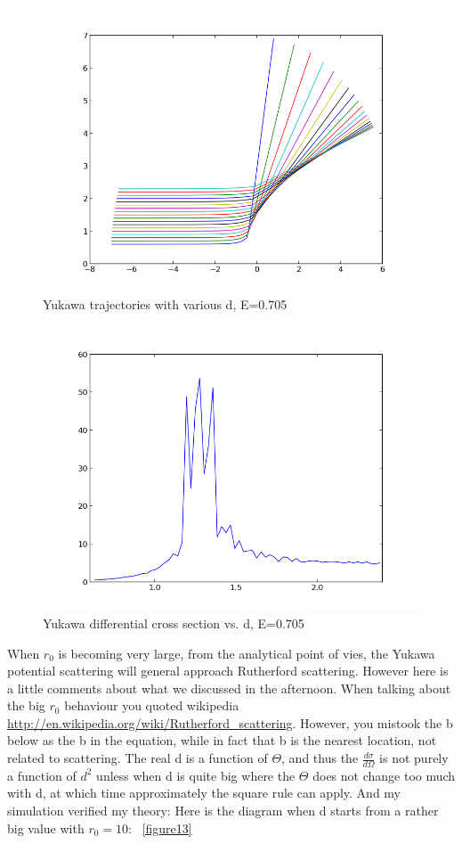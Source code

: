 \documentclass[11pt,letterpaper]{article}
\begin{document}
\begin{figure}
\begin{center}
\includegraphics[width=0.9\linewidth,angle=0]{Yukawaall.png}
\caption{Yukawa trajectories with various d, E=0.705}
\label{figure11}
\end{center}
\end{figure}

\begin{figure}
\begin{center}
\includegraphics[width=0.9\linewidth,angle=0]{Yukawad.png}
\caption{Yukawa differential cross section vs. d, E=0.705}
\label{figure12}
\end{center}
\end{figure}


When $r_0$ is becoming very large, from the analytical point of vies, the Yukawa potential scattering will general approach Rutherford scattering. 
However here is a little comments about what we discussed in the afternoon. When talking about the big $r_0$ behaviour you quoted wikipedia \url{http://en.wikipedia.org/wiki/Rutherford_scattering}. However, you mistook the b below as the b in the equation, while in fact that b is the nearest location, not related to scattering. The real d is a function of $\Theta$, and thus the $\frac{d\sigma}{d\Omega}$ is not purely a function of $d^2$ unless when d is quite big where the $\Theta$ does not change too much with d, at which time approximately the square rule can apply. And my simulation verified my theory:
Here is the diagram when d starts from a rather big value with $r_0=10$: ~\ref{figure13}
\end{document}
